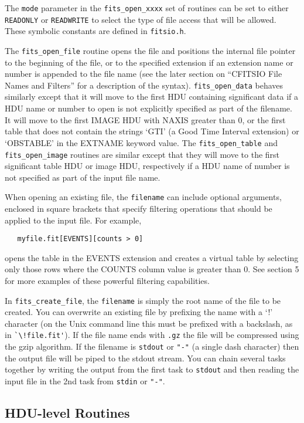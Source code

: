 \documentclass[11pt]{article}
\begin{document}
The {\tt mode} parameter in the {\tt fits\_open\_xxxx} set of routines
can be set to either {\tt READONLY} or {\tt READWRITE} to select the
type of file access that will be allowed. These symbolic constants are
defined in {\tt fitsio.h}.

The {\tt fits\_open\_file} routine opens the file and positions the internal
file pointer to the beginning of the file, or to the specified
extension if an extension name or number is appended to the file name
(see the later section on ``CFITSIO File Names and Filters'' for a
description of the syntax). {\tt fits\_open\_data} behaves similarly except
that it will move to the first HDU containing significant data if a HDU
name or number to open is not explicitly specified as part of the
filename.  It will move to the first IMAGE HDU with NAXIS greater than
0, or the first table that does not contain the strings `GTI' (a Good
Time Interval extension) or `OBSTABLE' in the EXTNAME keyword value.
The {\tt fits\_open\_table} and {\tt fits\_open\_image}  routines are similar
except that they will move to the first significant table HDU or image
HDU, respectively if a HDU name of number is not specified as part of
the input file name.

When opening an existing file, the {\tt filename} can include optional
arguments, enclosed in square brackets that specify filtering
operations that should be applied to the input file.  For example,
\begin{verbatim}
   myfile.fit[EVENTS][counts > 0]
\end{verbatim}
opens the table in the EVENTS extension and creates a virtual table by
selecting only those rows where the COUNTS column value is greater than
0.  See section 5 for more examples of these powerful filtering
capabilities.

In {\tt fits\_create\_file},  the {\tt filename} is simply the root name of
the file to be created.  You can overwrite an existing file by
prefixing the name with a `!' character (on the Unix command line this
must be prefixed with a backslash, as in \verb+`\!file.fit'+).  
If the file name ends with {\tt .gz} the file will be compressed
using the gzip algorithm.  If the
filename is {\tt stdout} or {\tt "-"} (a single dash character)
then the output file will be piped to the stdout stream.  You can
chain several tasks together by writing the output from the first task
to {\tt stdout} and then reading the input file in the 2nd task from
{\tt stdin} or {\tt "-"}.


{\bf \subsection{HDU-level Routines}}
\end{document}
